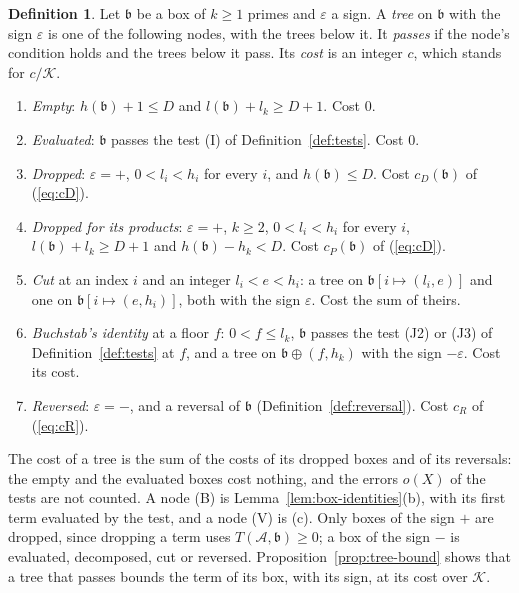 \documentclass[11pt]{article}
\theoremstyle{definition}
\newtheorem{definition}[theorem]{Definition}
\begin{document}
\begin{definition}\label{def:tree}
Let $\mathfrak b$ be a box of $k \ge 1$ primes and $\varepsilon$ a sign. A \emph{tree} on $\mathfrak b$ with the sign
$\varepsilon$ is one of the following nodes, with the trees below it. It \emph{passes} if the node's condition holds and
the trees below it pass. Its \emph{cost} is an integer $c$, which stands for $c/\mathcal K$.
\begin{enumerate}
\item[(V)] \emph{Empty}: $h(\mathfrak b) + 1 \le D$ and $l(\mathfrak b) + l_k \ge D + 1$. Cost $0$.
\item[(E)] \emph{Evaluated}: $\mathfrak b$ passes the test (I) of Definition~\ref{def:tests}. Cost $0$.
\item[(D)] \emph{Dropped}: $\varepsilon = +$, $0 < l_i < h_i$ for every $i$, and $h(\mathfrak b) \le D$. Cost
  $c_D(\mathfrak b)$ of (\ref{eq:cD}).
\item[(P)] \emph{Dropped for its products}: $\varepsilon = +$, $k \ge 2$, $0 < l_i < h_i$ for every $i$, $l(\mathfrak b)
  + l_k \ge D + 1$ and $h(\mathfrak b) - h_k < D$. Cost $c_P(\mathfrak b)$ of (\ref{eq:cD}).
\item[(S)] \emph{Cut} at an index $i$ and an integer $l_i < e < h_i$: a tree on $\mathfrak b[i \mapsto (l_i, e)]$ and
  one on $\mathfrak b[i \mapsto (e, h_i)]$, both with the sign $\varepsilon$. Cost the sum of theirs.
\item[(B)] \emph{Buchstab's identity} at a floor $f$: $0 < f \le l_k$, $\mathfrak b$ passes the test (J2) or (J3) of
  Definition~\ref{def:tests} at $f$, and a tree on $\mathfrak b \oplus (f, h_k)$ with the sign $-\varepsilon$. Cost its
  cost.
\item[(R)] \emph{Reversed}: $\varepsilon = -$, and a reversal of $\mathfrak b$ (Definition~\ref{def:reversal}). Cost
  $c_R$ of (\ref{eq:cR}).
\end{enumerate}
\end{definition}

The cost of a tree is the sum of the costs of its dropped boxes and of its reversals: the empty and the evaluated boxes
cost nothing, and the errors $o(X)$ of the tests are not counted. A node (B) is Lemma~\ref{lem:box-identities}(b), with
its first term evaluated by the test, and a node (V) is (c). Only boxes of the sign $+$ are dropped, since dropping a
term uses $T(\mathcal A, \mathfrak b) \ge 0$; a box of the sign $-$ is evaluated, decomposed, cut or reversed.
Proposition~\ref{prop:tree-bound} shows that a tree that passes bounds the term of its box, with its sign, at its cost
over $\mathcal K$.
\end{document}
